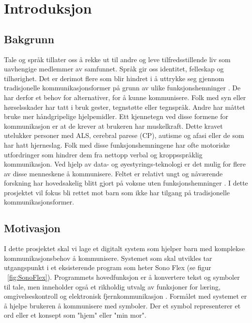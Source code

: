 
\chapter{Introduksjon}


\section{Bakgrunn}
\label{sec:motivasjon}

Tale og språk tillater oss å rekke ut til andre og leve tilfredsstillende liv som uavhengige medlemmer av samfunnet. Språk gir oss identitet, felleskap og tilhørighet. Det er derimot flere som blir hindret i å uttrykke seg gjennom tradisjonelle kommunikasjonsformer på grunn av ulike funksjonshemninger \cite{tobii}. De har derfor et behov for alternativer, for å kunne kommunisere. Folk med syn eller hørselsskader har tatt i bruk gester, tegnstøtte eller tegnspråk. Andre har måttet bruke mer håndgripelige hjelpemidler. Ett kjennetegn ved disse formene for kommunikasjon er at de krever at brukeren har muskelkraft. Dette kravet utelukker  personer med ALS, cerebral parese (CP), autisme og afasi eller de som har hatt hjerneslag. Folk med disse funksjonshemningene har ofte motoriske utfordringer som hindrer dem fra nettopp verbal og kroppsspråklig kommunikasjon. Ved hjelp av data- og øyestyrings-teknologi er det mulig for flere av disse menneskene å kommunisere. Feltet er relativt ungt og nåværende forskning har hovedsakelig blitt gjort på voksne uten funksjonshemninger \cite{aac}. I dette prosjektet vil fokus bli rettet mot barn som ikke har tilgang på tradisjonelle kommunikasjonsformer. 


\section{Motivasjon}
\label{sec:goal}

I dette prosjektet skal vi lage et digitalt system som hjelper barn med komplekse kommunikasjonsbehov å kommunisere. Systemet som skal utvikles tar utgangspunkt i et eksisterende program som heter Sono Flex (se figur ~\ref{fig:SonoFlex}). Programmets hovedfunksjon er å konvertere tekst og symboler til tale, men inneholder også et rikholdig utvalg av funksjoner for læring, omgivelseskontroll og elektronisk fjernkommunikasjon \cite{TobiiCommunicator}. Formålet med systemet er å hjelpe brukeren å kommunisere med symboler. Der et symbol representerer et ord eller et konsept som "hjem" eller "min mor". 

